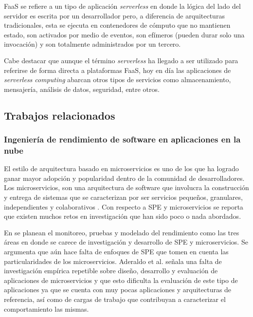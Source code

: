 FaaS se refiere a un tipo de aplicación \emph{serverless} en donde la lógica del lado del servidor es escrita por un desarrollador pero, a diferencia de arquitecturas tradicionales, esta se ejecuta en contenedores de cómputo que no mantienen estado, son activados por medio de eventos, son efímeros (pueden durar solo una invocación) y son totalmente administrados por un tercero\cite{mike-roberts-serverless}.

Cabe destacar que aunque el término \emph{serverless} ha llegado a ser utilizado para referirse de forma directa a plataformas FaaS, hoy en día las aplicaciones de \emph{serverless computing} abarcan otros tipos de servicios como almacenamiento, mensajería, análisis de datos, seguridad, entre otros.


\subsection{Trabajos relacionados}

\subsubsection{Ingeniería de rendimiento de software en aplicaciones en la nube}

El estilo de arquitectura basado en microservicios es uno de los que ha logrado ganar mayor adopción y popularidad dentro de la comunidad de desarrolladores. Los microservicios, son una arquitectura de software que involucra la construcción y entrega de sistemas que se caracterizan por ser servicios pequeños, granulares, independientes y colaborativos \cite{10.1007/978-3-319-62636-9_11}. Con respecto a SPE y microservicios se reporta que existen muchos retos en investigación que han sido poco o nada abordados. 

En \cite{Heinrich:2017:PEM:3053600.3053653} se planean el monitoreo, pruebas y modelado del rendimiento como las tres áreas en donde se carece de investigación y desarrollo de SPE y microservicios. Se argumenta que aún hace falta de enfoques de SPE que tomen en cuenta las particularidades de los microservicios. Aderaldo et al.\cite{7968049} señala una falta de investigación empírica repetible sobre diseño, desarrollo y evaluación de aplicaciones de microservicios y que esto dificulta la evaluación de este tipo de aplicaciones ya que se cuenta con muy pocas aplicaciones y arquitecturas de referencia, así como de cargas de trabajo que contribuyan a caracterizar el comportamiento las mismas.


